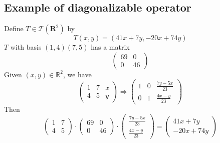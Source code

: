 \documentclass{article}
\begin{document}
\subsection*{Example of diagonalizable operator}
Define $T \in \mathcal{T}(\mathbf{R}^2)$ by
\begin{equation*}
    T(x, y) = (41x + 7y, -20x + 74y)
\end{equation*}
$T$ with basis $(1, 4)(7, 5)$ has a matrix
\begin{equation*}
    \begin{pmatrix}
        69 & 0\\
        0 & 46
    \end{pmatrix}
\end{equation*}
Given $(x, y) \in \mathbb{R}^2$, we have
\begin{equation*}
    \begin{pmatrix}
        1 & 7 & x\\
        4 & 5 & y
    \end{pmatrix} \Rightarrow
    \begin{pmatrix}
        1 & 0 & \frac{7y-5x}{23}\\
        0 & 1 & \frac{4x-y}{23}
    \end{pmatrix}
\end{equation*}
Then
\begin{equation*}
    \begin{pmatrix}
        1 & 7\\
        4 & 5
    \end{pmatrix} \cdot
    \begin{pmatrix}
        69 & 0\\
        0 & 46
    \end{pmatrix} \cdot
    \begin{pmatrix}
        \frac{7y - 5x}{23}\\
        \frac{4x- y}{23}
    \end{pmatrix} =
    \begin{pmatrix}
        41x + 7y\\
        -20x + 74y
    \end{pmatrix}
\end{equation*}
\end{document}
